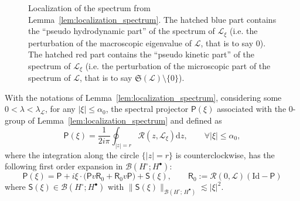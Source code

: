 \documentclass[AHL,Unicode,longabstracts,published]{cedram}
\newcommand{\Id}{\mathrm{Id}}
\renewcommand{\d}{\mathrm{d}}
\newcommand{\sfR}{\mathsf{R}}
\newcommand{\sfS}{\mathsf{S}}
\newcommand{\fkS}{\mathfrak{S}}
\newcommand{\BB}{\mathcal{B}}
\newcommand{\LL}{\mathcal{L}}
\newcommand{\PP}{\mathsf{P}}
\newcommand{\RR}{\mathcal{R}}
\newcommand{\BBB}{\mathscr{B}}
\newcommand{\Ssp}{H^{\bullet}}
\newcommand{\Ssm}{H^{\circ}}
\renewcommand*\le{\leqslant}
\let\oldforall\forall
\renewcommand*{\forall}{\mathrel{\oldforall}}
\begin{document}
\begin{figure}[h]

\centering


\caption{Localization of the spectrum from Lemma~\ref{lem:localization_spectrum}. The hatched blue part contains the ``pseudo hydrodynamic part'' of the spectrum of $\LL_\xi$ (i.e. the perturbation of the macroscopic eigenvalue of $\LL$, that is to say $0$). The hatched red part contains the ``pseudo kinetic part'' of the spectrum of $\LL_\xi$ (i.e. the perturbation of the microscopic part of the spectrum of $\LL$, that is to say $\fkS(\LL) \setminus \{0\}$).}
\end{figure}


\begin{lemm}\label{lem:expansion_projection}
With the notations of Lemma~\ref{lem:localization_spectrum}, considering some $0 < \lambda < \lambda_\LL$, for any $|\xi| \le \alpha_{0}$, the spectral projector $\PP(\xi)$ associated with the $0$-group of Lemma~\ref{lem:localization_spectrum} and defined as
\[
\PP(\xi) = \frac{1}{2 i \pi} \oint_{|z| = r } \RR(z,\LL_{\xi}) \d z, \qquad \forall | \xi | \le \alpha_0,
\]
where the integration along the circle $\{ |z| = r \}$ is counterclockwise, has the following first order expansion in $\BBB(\Ssm ; \Ssp)$:
\begin{equation*}
\PP(\xi) = \PP + i \xi \cdot \Big(\PP v\sfR_{0} +\sfR_{0} v \PP \Big) + \sfS(\xi), \qquad \sfR_{0}:=\RR(0,\LL)\left(\Id-\PP\right)
\end{equation*}
where $\sfS(\xi) \in \BBB(\Ssm ;\Ssp)$ with $\|\sfS(\xi)\|_{\BBB(\Ssm ;\,\Ssp)} \lesssim | \xi |^2$.
\end{lemm}
\end{document}

